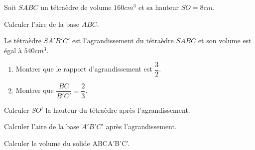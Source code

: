 \documentclass[12pt]{article}
\begin{document}
\begin{exo}[6]
\begin{enumerate}
\begin{minipage}{.65\linewidth}
\begin{EnvFullwidth}
Soit $SABC$  un tétraèdre de volume $160 cm^3$ et sa hauteur $SO=8cm$.
\end{EnvFullwidth}
\item {} Calculer l'aire de la base $ABC$.\\\anserline[3]
\item {} Le tétraèdre $SA'B'C'$ est l'agrandissement du tétraèdre $SABC$ et son volume est égal à $540 cm^3$.
\end{minipage}%
\begin{minipage}{.35\linewidth}
\end{minipage}%
\begin{enumerate}
\item {} Montrer que le rapport d'agrandissement est $\dfrac{3}{2}$.\\\anserline[3]
\item Montrer que $\dfrac{BC}{B'C'}=\dfrac{2}{3}$.\\\anserline[4]
\end{enumerate}
\item{} Calculer $SO'$ la hauteur du tétraèdre après l'agrandissement.\\\anserline[3]
\item{} Calculer l'aire de la base $A'B'C'$ après l'agrandissement.\\\anserline[4]
\item {}Calculer le volume du solide ABCA'B'C'.\par\anserline[4]
\end{enumerate}
\end{exo}
\end{document}
